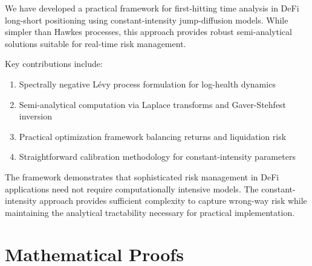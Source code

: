 \documentclass{article}
\theoremstyle{definition}
\begin{document}
We have developed a practical framework for first-hitting time analysis in DeFi long-short positioning using constant-intensity jump-diffusion models. While simpler than Hawkes processes, this approach provides robust semi-analytical solutions suitable for real-time risk management.

Key contributions include:
\begin{enumerate}
    \item Spectrally negative Lévy process formulation for log-health dynamics
    \item Semi-analytical computation via Laplace transforms and Gaver-Stehfest inversion
    \item Practical optimization framework balancing returns and liquidation risk
    \item Straightforward calibration methodology for constant-intensity parameters
\end{enumerate}

The framework demonstrates that sophisticated risk management in DeFi applications need not require computationally intensive models. The constant-intensity approach provides sufficient complexity to capture wrong-way risk while maintaining the analytical tractability necessary for practical implementation.


\appendix

\section{Mathematical Proofs}
\label{sec:proofs}
\end{document}
